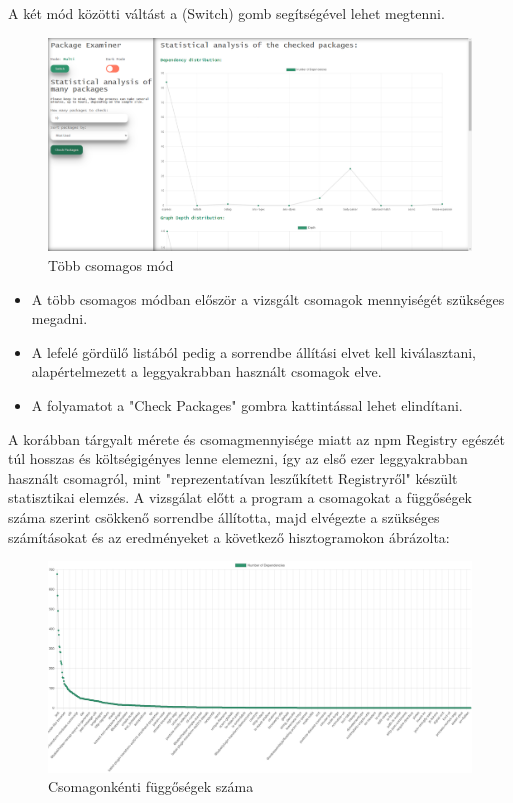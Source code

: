 \pagebreak

A két mód közötti váltást a (Switch) gomb segítségével lehet megtenni.

\begin{figure}[!h]
	\centering
	\includegraphics[scale=0.2]{images/statistics.png}
	\caption{Több csomagos mód}
	\label{fig:statistics}
\end{figure}

\begin{itemize}
	\item A több csomagos módban először a vizsgált csomagok mennyiségét szükséges megadni.
	\item A lefelé gördülő listából pedig a sorrendbe állítási elvet kell kiválasztani, alapértelmezett a leggyakrabban használt csomagok elve.
	\item A folyamatot a "Check Packages" gombra kattintással lehet elindítani.
\end{itemize}


A korábban tárgyalt mérete és csomagmennyisége miatt az npm Registry egészét túl hosszas és költségigényes lenne elemezni, így az első ezer leggyakrabban használt csomagról, mint "reprezentatívan leszűkített Registryről" készült statisztikai elemzés. A vizsgálat előtt a program a csomagokat a függőségek száma szerint csökkenő sorrendbe állította, majd elvégezte a szükséges számításokat és az eredményeket a következő hisztogramokon ábrázolta:

\begin{figure}[!h]
	\centering
	\includegraphics[scale=0.12]{images/depdist.png}
	\caption{Csomagonkénti függőségek száma}
	\label{fig:depdist}
\end{figure}  


